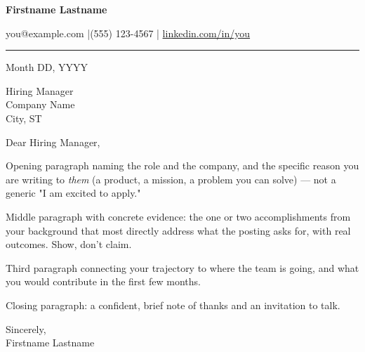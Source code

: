 \documentclass[11pt,letterpaper]{article}
\begin{document}
{\huge\bfseries\color{accent} Firstname Lastname\par}
\vspace{2pt}
{\small\color{muted}%
  you@example.com \quad|\quad (555) 123-4567 \quad|\quad
  \href{https://linkedin.com/in/you}{linkedin.com/in/you}\par}
\vspace{4pt}
{\color{accent}\rule{\linewidth}{0.8pt}}

\vspace{12pt}

Month DD, YYYY

\vspace{8pt}

Hiring Manager\\
Company Name\\
City, ST

\vspace{12pt}

Dear Hiring Manager,

\vspace{6pt}

Opening paragraph naming the role and the company, and the specific reason you are
writing to \emph{them} (a product, a mission, a problem you can solve) --- not a generic
"I am excited to apply."

Middle paragraph with concrete evidence: the one or two accomplishments from your
background that most directly address what the posting asks for, with real outcomes.
Show, don't claim.

Third paragraph connecting your trajectory to where the team is going, and what you
would contribute in the first few months.

Closing paragraph: a confident, brief note of thanks and an invitation to talk.

\vspace{8pt}

Sincerely,\\[6pt]
Firstname Lastname
\end{document}
